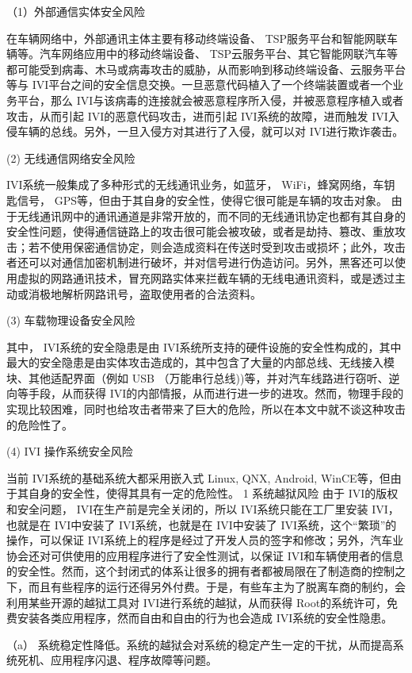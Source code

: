 （1）外部通信实体安全风险

在车辆网络中，外部通讯主体主要有移动终端设备、 TSP服务平台和智能网联车辆等。汽车网络应用中的移动终端设备、 TSP云服务平台、其它智能网联汽车等都可能受到病毒、木马或病毒攻击的威胁，从而影响到移动终端设备、云服务平台等与 IVI平台之间的安全信息交换。一旦恶意代码植入了一个终端装置或者一个业务平台，那么 IVI与该病毒的连接就会被恶意程序所入侵，并被恶意程序植入或者攻击，从而引起 IVI的恶意代码攻击，进而引起 IVI系统的故障，进而触发 IVI入侵车辆的总线。另外，一旦入侵方对其进行了入侵，就可以对 IVI进行欺诈袭击。

(2) 无线通信网络安全风险 

IVI系统一般集成了多种形式的无线通讯业务，如蓝牙， WiFi，蜂窝网络，车钥匙信号， GPS等，但由于其自身的安全性，使得它很可能是车辆的攻击对象。
由于无线通讯网中的通讯通道是非常开放的，而不同的无线通讯协定也都有其自身的安全性问题，使得通信链路上的攻击很可能会被攻破，或者是劫持、篡改、重放攻击；若不使用保密通信协定，则会造成资料在传送时受到攻击或损坏；此外，攻击者还可以对通信加密机制进行破坏，并对信号进行伪造访问。另外，黑客还可以使用虚拟的网路通讯技术，冒充网路实体来拦截车辆的无线电通讯资料，或是透过主动或消极地解析网路讯号，盗取使用者的合法资料。

(3) 车载物理设备安全风险 

其中， IVI系统的安全隐患是由 IVI系统所支持的硬件设施的安全性构成的，其中最大的安全隐患是由实体攻击造成的，其中包含了大量的内部总线、无线接入模块、其他适配界面（例如 USB （万能串行总线))等，并对汽车线路进行窃听、逆向等手段，从而获得 IVI的内部情报，从而进行进一步的进攻。然而，物理手段的实现比较困难，同时也给攻击者带来了巨大的危险，所以在本文中就不谈这种攻击的危险性了。

(4) IVI 操作系统安全风险 

当前 IVI系统的基础系统大都采用嵌入式 Linux, QNX, Android, WinCE等，但由于其自身的安全性，使得其具有一定的危险性。
1 系统越狱风险    
由于 IVI的版权和安全问题， IVI在生产前是完全关闭的，所以 IVI系统只能在工厂里安装 IVI，也就是在 IVI中安装了 IVI系统，也就是在 IVI中安装了 IVI系统，这个“繁琐”的操作，可以保证 IVI系统上的程序是经过了开发人员的签字和修改；另外，汽车业协会还对可供使用的应用程序进行了安全性测试，以保证 IVI和车辆使用者的信息的安全性。然而，这个封闭式的体系让很多的拥有者都被局限在了制造商的控制之下，而且有些程序的运行还得另外付费。于是，有些车主为了脱离车商的制约，会利用某些开源的越狱工具对 IVI进行系统的越狱，从而获得 Root的系统许可，免费安装各类应用程序，然而自由和自由的行为也会造成 IVI系统的安全性隐患。

（a） 系统稳定性降低。系统的越狱会对系统的稳定产生一定的干扰，从而提高系统死机、应用程序闪退、程序故障等问题。

